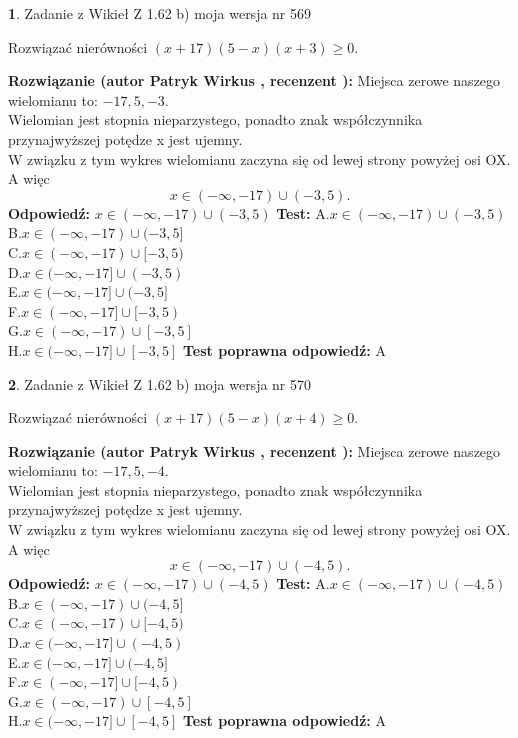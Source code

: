\documentclass[12pt, a4paper]{article}
\theoremstyle{definition} %
\newtheorem{zad}{}
\newcommand{\zadStart}[1]{\begin{zad}#1\newline}
\newcommand{\zadStop}{\end{zad}}
\newcommand{\rozwStart}[2]{\noindent \textbf{Rozwiązanie (autor #1 , recenzent #2): }\newline}
\newcommand{\rozwStop}{\newline}
\newcommand{\odpStart}{\noindent \textbf{Odpowiedź:}\newline}
\newcommand{\odpStop}{\newline}
\newcommand{\testStart}{\noindent \textbf{Test:}\newline}
\newcommand{\testStop}{\newline}
\newcommand{\kluczStart}{\noindent \textbf{Test poprawna odpowiedź:}\newline}
\newcommand{\kluczStop}{\newline}
\begin{document}
\zadStart{Zadanie z Wikieł Z 1.62 b) moja wersja nr 569}

Rozwiązać nierówności $(x+17)(5-x)(x+3)\ge0$.
\zadStop
\rozwStart{Patryk Wirkus}{}
Miejsca zerowe naszego wielomianu to: $-17, 5, -3$.\\
Wielomian jest stopnia nieparzystego, ponadto znak współczynnika przy\linebreak najwyższej potędze x jest ujemny.\\ W związku z tym wykres wielomianu zaczyna się od lewej strony powyżej osi OX. A więc $$x \in (-\infty,-17) \cup (-3,5).$$
\rozwStop
\odpStart
$x \in (-\infty,-17) \cup (-3,5)$
\odpStop
\testStart
A.$x \in (-\infty,-17) \cup (-3,5)$\\
B.$x \in (-\infty,-17) \cup (-3,5]$\\
C.$x \in (-\infty,-17) \cup [-3,5)$\\
D.$x \in (-\infty,-17] \cup (-3,5)$\\
E.$x \in (-\infty,-17] \cup (-3,5]$\\
F.$x \in (-\infty,-17] \cup [-3,5)$\\
G.$x \in (-\infty,-17) \cup [-3,5]$\\
H.$x \in (-\infty,-17] \cup [-3,5]$
\testStop
\kluczStart
A
\kluczStop



\zadStart{Zadanie z Wikieł Z 1.62 b) moja wersja nr 570}

Rozwiązać nierówności $(x+17)(5-x)(x+4)\ge0$.
\zadStop
\rozwStart{Patryk Wirkus}{}
Miejsca zerowe naszego wielomianu to: $-17, 5, -4$.\\
Wielomian jest stopnia nieparzystego, ponadto znak współczynnika przy\linebreak najwyższej potędze x jest ujemny.\\ W związku z tym wykres wielomianu zaczyna się od lewej strony powyżej osi OX. A więc $$x \in (-\infty,-17) \cup (-4,5).$$
\rozwStop
\odpStart
$x \in (-\infty,-17) \cup (-4,5)$
\odpStop
\testStart
A.$x \in (-\infty,-17) \cup (-4,5)$\\
B.$x \in (-\infty,-17) \cup (-4,5]$\\
C.$x \in (-\infty,-17) \cup [-4,5)$\\
D.$x \in (-\infty,-17] \cup (-4,5)$\\
E.$x \in (-\infty,-17] \cup (-4,5]$\\
F.$x \in (-\infty,-17] \cup [-4,5)$\\
G.$x \in (-\infty,-17) \cup [-4,5]$\\
H.$x \in (-\infty,-17] \cup [-4,5]$
\testStop
\kluczStart
A
\kluczStop
\end{document}
